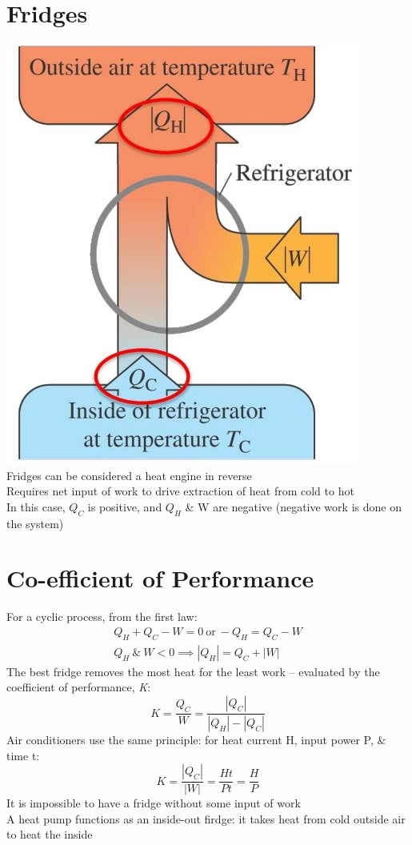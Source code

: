 \documentclass[a4paper, 11pt, normalem]{report}
\begin{document}
\section{Fridges}
\includegraphics[scale=0.7]{Fridge.jpg} \\
Fridges can be considered a heat engine in reverse \\
Requires net input of work to drive extraction of heat from cold to hot \\
In this case, $Q_{C}$ is positive, and $Q_{H}$ \& W are negative (negative work is done on the system)

\section{Co-efficient of Performance}
For a cyclic process, from the first law:
\begin{gather*}
	Q_{H} + Q_{C} - W = 0 ~\text{or}~ -Q_{H} = Q_{C} - W \\
	Q_{H} ~\&~ W < 0 \implies |Q_{H}| = Q_{C} + |W|
\end{gather*}
The best fridge removes the most heat for the least work -- evaluated by the coefficient of performance, \emph{K}:
\begin{equation*}
	K = \frac{Q_{C}}{W} = \frac{|Q_{C}|}{|Q_{H}| - |Q_{C}|}
\end{equation*}
Air conditioners use the same principle: for heat current H, input power P, \& time t:
\begin{equation*}
	K = \frac{|Q_{C}|}{|W|} = \frac{Ht}{Pt} = \frac{H}{P}
\end{equation*}
It is impossible to have a fridge without some input of work \\
A heat pump functions as an inside-out firdge: it takes heat from cold outside air to heat the inside
\end{document}
